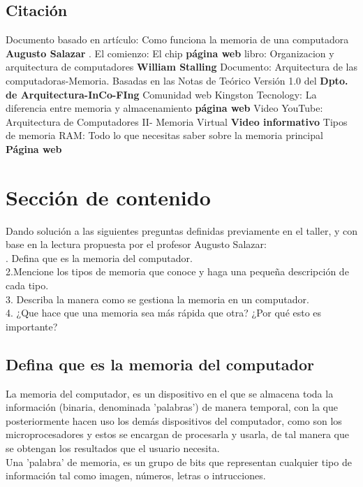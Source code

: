 \documentclass{article}
\begin{document}
\subsection{Citación}
Documento basado en artículo: Como funciona la memoria de una computadora \textbf{Augusto Salazar} \cite{Salazar}.
El comienzo: El chip \textbf{página web}
\cite{website}
libro: Organizacion y arquitectura de computadores \textbf{William Stalling} \cite{Stalling}
Documento: Arquitectura de las computadoras-Memoria. Basadas en las Notas de Teórico Versión 1.0 del \textbf{Dpto. de Arquitectura-InCo-FIng}\cite{document}
Comunidad web Kingston Tecnology: La diferencia entre memoria y almacenamiento \textbf{página web} \cite{Communitywebsite}
Video YouTube: Arquitectura de Computadores II- Memoria Virtual \textbf{Video informativo} \cite{Youtubevideo}
Tipos de memoria RAM: Todo lo que necesitas saber sobre la memoria principal \textbf{Página web} \cite{documentweb}

\section{Sección de contenido} \label{contenido}
Dando solución a las siguientes preguntas definidas previamente en el taller, y con base en la lectura propuesta por el profesor Augusto Salazar:\\

%
. Defina que es la memoria del computador.\\
2.Mencione los tipos de memoria que conoce y haga una pequeña descripción de cada tipo.\\
3. Describa la manera como se gestiona la memoria en un computador.\\
4. ¿Que hace que una memoria sea más rápida que otra? ¿Por qué esto es importante?\\


\subsection{Defina que es la memoria del computador}
%

La memoria del computador, es un dispositivo en el que se almacena toda la información (binaria, denominada 'palabras') de manera temporal, con la que posteriormente hacen uso los demás dispositivos del computador, como son los microprocesadores y estos se encargan de procesarla y usarla, de tal manera que se obtengan los resultados que el usuario necesita.\\
\noindent
Una 'palabra' de memoria, es un grupo de bits que representan cualquier tipo de información tal como imagen, números, letras o intrucciones.\\
\end{document}
